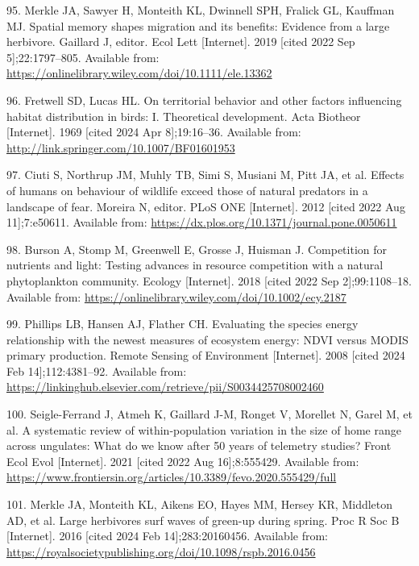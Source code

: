 \documentclass[
  12pt,
]{article}
\newlength{\cslhangindent}
\newenvironment{CSLReferences}[2] %
 {\begin{list}{}{%
  \setlength{\itemindent}{0pt}
  \setlength{\leftmargin}{0pt}
  \setlength{\parsep}{0pt}
  \ifodd #1
   \setlength{\leftmargin}{\cslhangindent}
   \setlength{\itemindent}{-1\cslhangindent}
  \fi
  \setlength{\itemsep}{#2\baselineskip}}}
 {\end{list}}
\begin{document}
\begin{CSLReferences}{0}{1}
95. Merkle JA, Sawyer H, Monteith KL, Dwinnell SPH, Fralick GL, Kauffman MJ. Spatial memory shapes migration and its benefits: Evidence from a large herbivore. Gaillard J, editor. Ecol Lett {[}Internet{]}. 2019 {[}cited 2022 Sep 5{]};22:1797--805. Available from: \url{https://onlinelibrary.wiley.com/doi/10.1111/ele.13362}

96. Fretwell SD, Lucas HL. On territorial behavior and other factors influencing habitat distribution in birds: I. Theoretical development. Acta Biotheor {[}Internet{]}. 1969 {[}cited 2024 Apr 8{]};19:16--36. Available from: \url{http://link.springer.com/10.1007/BF01601953}

97. Ciuti S, Northrup JM, Muhly TB, Simi S, Musiani M, Pitt JA, et al. Effects of humans on behaviour of wildlife exceed those of natural predators in a landscape of fear. Moreira N, editor. {PLoS} {ONE} {[}Internet{]}. 2012 {[}cited 2022 Aug 11{]};7:e50611. Available from: \url{https://dx.plos.org/10.1371/journal.pone.0050611}

98. Burson A, Stomp M, Greenwell E, Grosse J, Huisman J. Competition for nutrients and light: Testing advances in resource competition with a natural phytoplankton community. Ecology {[}Internet{]}. 2018 {[}cited 2022 Sep 2{]};99:1108--18. Available from: \url{https://onlinelibrary.wiley.com/doi/10.1002/ecy.2187}

99. Phillips LB, Hansen AJ, Flather CH. Evaluating the species energy relationship with the newest measures of ecosystem energy: {NDVI} versus {MODIS} primary production. Remote Sensing of Environment {[}Internet{]}. 2008 {[}cited 2024 Feb 14{]};112:4381--92. Available from: \url{https://linkinghub.elsevier.com/retrieve/pii/S0034425708002460}

100. Seigle-Ferrand J, Atmeh K, Gaillard J-M, Ronget V, Morellet N, Garel M, et al. A systematic review of within-population variation in the size of home range across ungulates: What do we know after 50 years of telemetry studies? Front Ecol Evol {[}Internet{]}. 2021 {[}cited 2022 Aug 16{]};8:555429. Available from: \url{https://www.frontiersin.org/articles/10.3389/fevo.2020.555429/full}

101. Merkle JA, Monteith KL, Aikens EO, Hayes MM, Hersey KR, Middleton AD, et al. Large herbivores surf waves of green-up during spring. Proc R Soc B {[}Internet{]}. 2016 {[}cited 2024 Feb 14{]};283:20160456. Available from: \url{https://royalsocietypublishing.org/doi/10.1098/rspb.2016.0456}


\end{CSLReferences}
\end{document}
